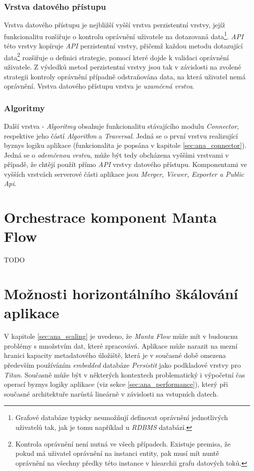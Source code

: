 \subsubsection{Vrstva datového přístupu}
\label{sec:des_data_access}
Vrstva datového přístupu je nejbližší vyšší vrstva perzistentní vrstvy, jejíž funkcionalitu rozšiřuje o kontrolu oprávnění uživatele na dotazovaná data\footnote{Grafové databáze typicky neumožňují definovat oprávnění jednotlivých uživatelů tak, jak je tomu například u \textit{RDBMS} databází.}. \textit{API} této vrstvy kopíruje \textit{API} perzistentní vrstvy, přičemž každou metodu dotazující data\footnote{Kontrola oprávnění není nutná ve všech případech. Existuje premisa, že pokud má uživatel oprávnění na instanci entity, pak musí mít nuntě oprávnění na všechny předky této instance v hiearchii grafu datových toků.} rozšiřuje o definici strategie, pomocí které dojde k validaci oprávnění uživatele. Z výsledků metod perzistentní vrstvy jsou tak v závislosti na zvolené strategii kontroly oprávnění případně odstraňována data, na která uživatel nemá oprávnění. Vrstva datového přístupu vrstva je \textit{uzamčená vrstva}.

\subsubsection{Algoritmy}
Další vrstva - \textit{Algoritmy} obsahuje funkcionalitu stávajícího modulu \textit{Connector}, respektive jeho částí \textit{Algorithm} a \textit{Traversal}. Jedná se o první vrstvu realizující byznys logiku aplikace (funkcionalita je popsána v kapitole \ref{sec:ana_connector}). Jedná se o \textit{odemčenou vrstvu}, může být tedy obcházena vyššími vrstvami v případě, že chtějí použít přímo \textit{API} vrstvy datového přístupu. Komponentami ve vyšších vrstvách serverové části aplikace jsou \textit{Merger, Viewer, Exporter a Public Api}.


\section{Orchestrace komponent Manta Flow}
\label{sec:des_orchestration}
TODO

\section{Možnosti horizontálního škálování aplikace}
\label{sec:des_scaling}
V kapitole \ref{sec:ana_scaling} je uvedeno, že \textit{Manta Flow} může mít v budoucnu problémy s množstvím dat, které zpracovává. Aplikace může narazit na mezní hranici kapacity metadatového úložiště, která je v současné době omezena především používáním \textit{embedded} databáze \textit{Persistit} jako podkladové vrstvy pro \textit{Titan}. Současně může být v některých kontextech problematický i výpočetní čas operací byznys logiky aplikace (viz sekce \ref{sec:ana_performance}), který při současné architektuře narůstá lineárně v závislosti na vstupních datech.

